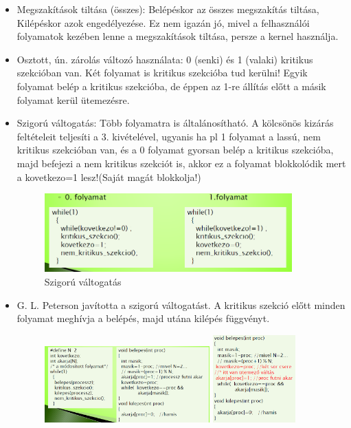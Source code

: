 \documentclass[margin=0px]{article}
\begin{document}
	\begin{itemize}
		\item Megszakítások tiltása (összes): Belépéskor az összes megszakítás tiltása, Kilépéskor azok engedélyezése. Ez nem igazán jó, mivel a felhasználói folyamatok kezében lenne a megszakítások tiltása, persze a kernel használja.
		\item Osztott, ún. zárolás változó használata: 0 (senki) és 1 (valaki) kritikus szekcióban van. Két folyamat is kritikus szekcióba tud kerülni! Egyik folyamat belép a kritikus szekcióba, de éppen az 1-re állítás előtt a másik folyamat kerül ütemezésre.
		\item Szigorú váltogatás: Több folyamatra is általánosítható. A kölcsönös kizárás feltételeit teljesíti a 3. kivételével, ugyanis ha pl 1 folyamat a lassú, nem kritikus szekcióban van, és a 0 folyamat gyorsan belép a kritikus szekcióba, majd befejezi a nem kritikus szekciót is, akkor ez a folyamat blokkolódik mert a kovetkezo=1 lesz!(Saját magát blokkolja!)
		\begin{figure}[H]
			\centering
			\includegraphics[width=0.9\textwidth]{img/szigoru.png}
			\caption{Szigorú váltogatás}
		\end{figure}
		\item G. L. Peterson javította a szigorú váltogatást. A kritikus szekció előtt minden folyamat meghívja a belépés, majd utána kilépés függvényt.
		\begin{figure}[H]
			\centering
			\includegraphics[width=0.6\textwidth]{img/peterson.png}
			\includegraphics[width=0.3\textwidth]{img/petersonhiba.png}

\end{figure}
\end{itemize}
\end{document}
